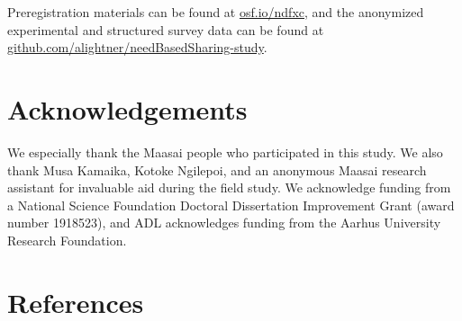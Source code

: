 \documentclass[
]{article}
\begin{document}
Preregistration materials can be found at \href{https://osf.io/ndfxc}{osf.io/ndfxc}, and the anonymized experimental and structured survey data can be found at \href{https://github.com/alightner/needBasedSharing-study}{github.com/alightner/needBasedSharing-study}.

\section*{Acknowledgements}

We especially thank the Maasai people who participated in this study. We also thank Musa Kamaika, Kotoke Ngilepoi, and an anonymous Maasai research assistant for invaluable aid during the field study. We acknowledge funding from a National Science Foundation Doctoral Dissertation Improvement Grant (award number 1918523), and ADL acknowledges funding from the Aarhus University Research Foundation.

\section*{References}
\end{document}
